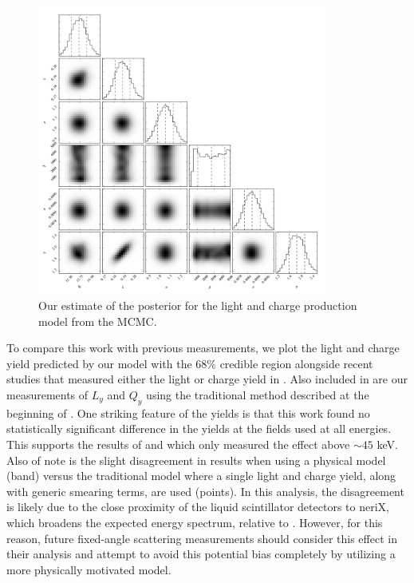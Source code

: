 


\begin{figure}[t]
        \centering
	\includegraphics[width=0.85\textwidth]{corner_plot_physical_pars}
	\caption{Our estimate of the posterior for the light and charge production model from the MCMC.}
	\label{fig:nerix_physical_corner}
\end{figure}


To compare this work with previous measurements, we plot the light and charge yield predicted by our model with the 68\% credible region alongside recent studies that measured either the light or charge yield in .  Also included in  are our measurements of $L_y$ and $Q_y$ using the traditional method described at the beginning of .   One striking feature of the yields is that this work found no statistically significant difference in the yields at the fields used at all energies.  This supports the results of  and  which only measured the effect above $\sim 45$ keV.  Also of note is the slight disagreement in results when using a physical model (band) versus the traditional model where a single light and charge yield, along with generic smearing terms, are used  (points).   In this analysis, the disagreement is likely due to the close proximity of the liquid scintillator detectors to neriX, which broadens the expected energy spectrum, relative to .  However, for this reason, future fixed-angle scattering measurements should consider this effect in their analysis and attempt to avoid this potential bias completely by utilizing a more physically motivated model.




